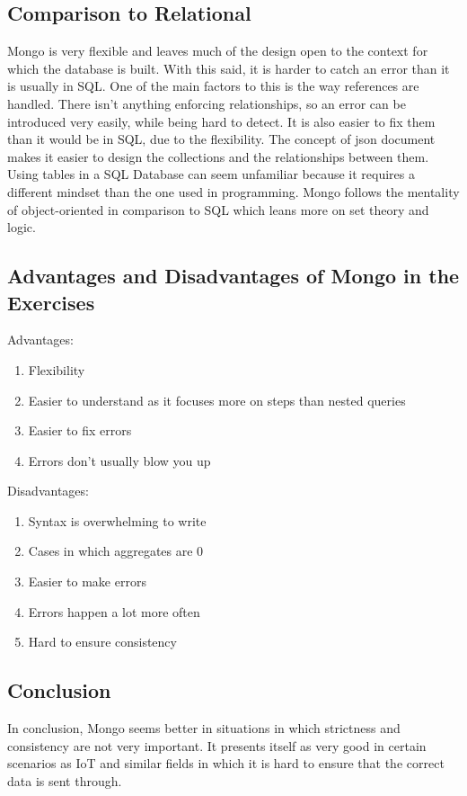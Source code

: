 \documentclass{article}
\begin{document}
	\subsection*{Comparison to Relational}
	Mongo is very flexible and leaves much of the design open to the context for which the database is built. With this said, it is harder to catch an error than it is usually in SQL. One of the main factors to this is the way references are handled. There isn't anything enforcing relationships, so an error can be introduced very easily, while being hard to detect. It is also easier to fix them than it would be in SQL, due to the flexibility. \newline
	The concept of json document makes it easier to design the collections and the relationships between them. Using tables in a SQL Database can seem unfamiliar because it requires a different mindset than the one used in programming. Mongo follows the mentality of object-oriented in comparison to SQL which leans more on set theory and logic. \newline
	
	\subsection*{Advantages and Disadvantages of Mongo in the Exercises}
	Advantages:
	\begin{enumerate}
		\item Flexibility
		\item Easier to understand as it focuses more on steps than nested queries
		\item Easier to fix errors
		\item Errors don't usually blow you up
	\end{enumerate}
	Disadvantages:
	\begin{enumerate}
		\item Syntax is overwhelming to write
		\item Cases in which aggregates are 0
		\item Easier to make errors
		\item Errors happen a lot more often
		\item Hard to ensure consistency
	\end{enumerate}
	\subsection*{Conclusion}
	In conclusion, Mongo seems better in situations in which strictness and consistency are not very important. It presents itself as very good in certain scenarios as IoT and similar fields in which it is hard to ensure that the correct data is sent through.
	
\end{document}
